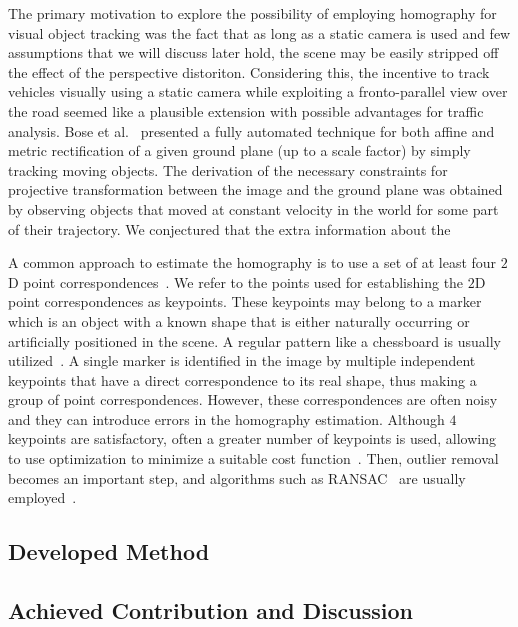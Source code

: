 The primary motivation to explore the possibility of employing homography for visual object tracking was the fact that as long as a static camera is used and few assumptions that we will discuss later hold, the scene may be easily stripped off the effect of the perspective distoriton. Considering this, the incentive to track vehicles visually using a static camera while exploiting a fronto-parallel view over the road seemed like a plausible extension with possible advantages for traffic analysis. Bose et al.~\cite{Bose04groundplane} presented a fully automated technique for both affine and metric rectification of a given ground plane (up to a scale factor) by simply tracking moving objects. The derivation of the necessary constraints for projective transformation between the image and the ground plane was obtained by observing objects that moved at constant velocity in the world for some part of their trajectory. We conjectured that the extra information about the 

A common approach to estimate the homography is to use a set of at least four $2$D point correspondences~\cite{hartley1997defense}. We refer to the points used for establishing the $2$D point correspondences as keypoints. These keypoints may belong to a marker which is an object with a known shape that is either naturally occurring or artificially positioned in the scene. A regular pattern like a chessboard is usually utilized~\cite{zhang2016flexible}. A single marker is identified in the image by multiple independent keypoints that have a direct correspondence to its real shape, thus making a group of point correspondences. However, these correspondences are often noisy and they can introduce errors in the homography estimation. Although $4$ keypoints are satisfactory, often a greater number of keypoints is used, allowing to use optimization to minimize a suitable cost function~\cite{osuna2016multiobjective, mou2013robust}. Then, outlier removal becomes an important step, and algorithms such as RANSAC~\cite{fischler1981random} are usually employed~\cite{osuna2016multiobjective}.

\subsection{Developed Method}

\subsection{Achieved Contribution and Discussion}
